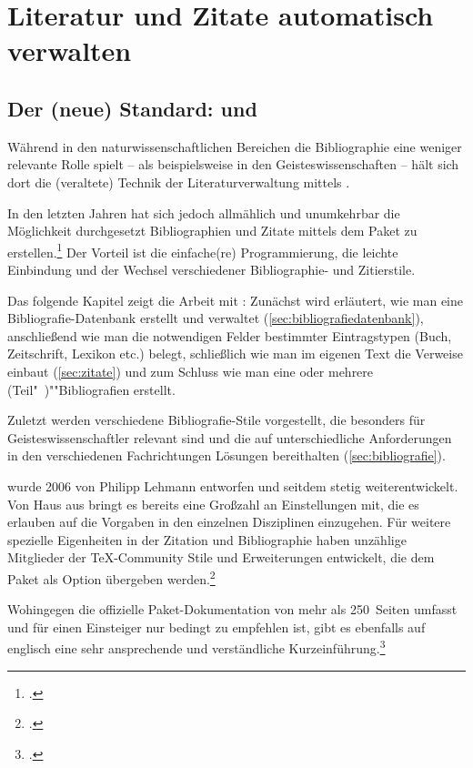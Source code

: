\chapter{Literatur und Zitate automatisch verwalten}
\label{biblatex}

\section{Der (neue) Standard:  und }
Während in den naturwissenschaftlichen Bereichen die Bibliographie eine
weniger relevante Rolle spielt -- als beispielsweise in den Geisteswissenschaften --
hält sich dort die (veraltete) Technik der Literaturverwaltung mittels \BibTeX.

In den letzten Jahren hat sich jedoch allmählich und unumkehrbar die Möglichkeit durchgesetzt Bibliographien und Zitate mittels dem Paket  zu erstellen.\footcite{wassenhoven:dtk2008/2,wassenhoven:dtk2008/4}
Der Vorteil ist die einfache(re) Programmierung, die leichte Einbindung und der Wechsel verschiedener Bibliographie- und Zitierstile.

Das folgende Kapitel zeigt die Arbeit mit : 
Zunächst wird erläutert, wie man eine Bibliografie-Datenbank erstellt und verwaltet (\cref{sec:bibliografiedatenbank}),
anschließend wie man die notwendigen Felder bestimmter Eintragstypen (Buch, Zeitschrift, Lexikon etc.) belegt, 
schließlich wie man im eigenen Text die Verweise einbaut (\cref{sec:zitate}) und
zum Schluss wie man eine oder mehrere (Teil"~)""Bibliografien erstellt.

Zuletzt werden verschiedene Bibliografie-Stile vorgestellt,
die besonders für Geisteswissenschaftler relevant sind und die auf unterschiedliche Anforderungen in den verschiedenen Fachrichtungen Lösungen bereithalten (\cref{sec:bibliografie}).


 wurde 2006 %
von Philipp Lehmann entworfen und seitdem stetig weiterentwickelt. 
Von Haus aus bringt es bereits eine Großzahl an Einstellungen mit, 
die es erlauben auf die Vorgaben in den einzelnen Disziplinen einzugehen. 
Für weitere spezielle Eigenheiten in der Zitation und Bibliographie haben unzählige Mitglieder der \TeX -Community Stile und Erweiterungen entwickelt,
die dem  Paket als Option übergeben werden.\footcite{voss:bibliografien}


Wohingegen die offizielle Paket-Dokumentation von   mehr als 250~Seiten umfasst und  für einen Einsteiger nur bedingt zu empfehlen ist,
gibt es ebenfalls auf englisch eine sehr ansprechende und verständliche Kurzeinführung.\footcite{biblatex-tutorial}

